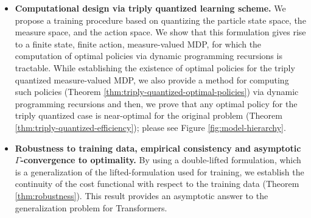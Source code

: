 \documentclass[11pt]{article}
\begin{document}
\begin{itemize}
\begin{figure}[H]
\centering

 \caption{Equivalence Properties of Control Policies for Transformer Design.}
\label{EquivalenceControlPol}
\end{figure}


    \item[(ii)] \textbf{Computational design via triply quantized learning scheme.} We propose a training procedure based on quantizing the particle state space, the measure space, and the action space. We show that this formulation gives rise to a finite state, finite action, measure-valued MDP, for which the computation of optimal policies via dynamic programming recursions is tractable. While establishing the existence of optimal policies for the triply quantized measure-valued MDP, we also provide a method for computing such policies (Theorem \ref{thm:triply-quantized-optimal-policies}) via dynamic programming recursions and then, we prove that any optimal policy for the triply quantized case is near-optimal for the original problem (Theorem \ref{thm:triply-quantized-efficiency}); please see Figure \ref{fig:model-hierarchy}. 
    \item[(iii)] \textbf{Robustness to training data, empirical consistency and asymptotic $\Gamma$-convergence to optimality.} By using a double-lifted formulation, which is a generalization of the lifted-formulation used for training, we establish the continuity of the cost functional with respect to the training data (Theorem \ref{thm:robustness}). This result provides an asymptotic answer to the generalization problem for Transformers.
\end{itemize} 
\end{document}
